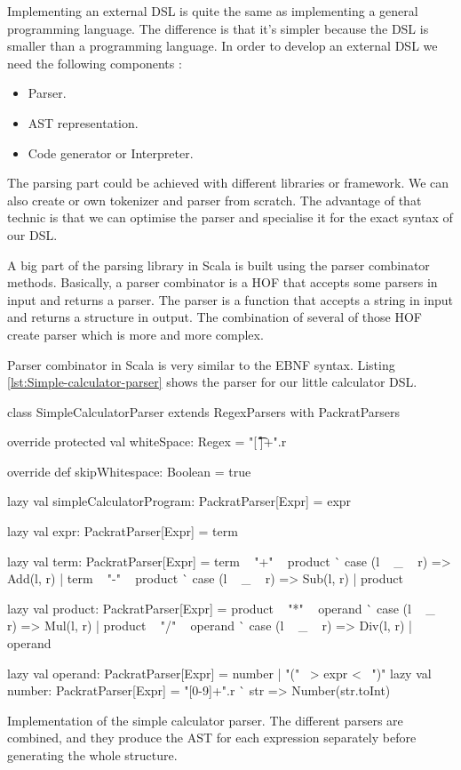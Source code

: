 Implementing an external \gls{DSL} is quite the same as implementing a general
programming language. The difference is that it's simpler because the \gls{DSL}
is smaller than a programming language. In order to develop an external
\gls{DSL} we need the following components :

\begin{itemize}
\item Parser.
\item \gls{AST} representation.
\item Code generator or Interpreter.
\end{itemize}


The parsing part could be achieved with different libraries or framework. We can
also create or own tokenizer and parser from scratch. The advantage of that
technic is that we can optimise the parser and specialise it for the exact
syntax of our \gls{DSL}.

A big part of the parsing library in Scala is built using the parser combinator
method\cite{Odersky:2016:PSU:2988396}s. Basically, a parser combinator is a
\gls{HOF} that accepts some parsers in input and returns a parser. The parser is
a function that accepts a string in input and returns a structure in output. The
combination of several of those \gls{HOF} create parser which is more and more
complex.

Parser combinator in Scala is very similar to the \gls{EBNF} syntax. Listing
\ref{lst:Simple-calculator-parser} shows the parser for our little calculator \gls{DSL}.

\begin{listing}[ht]
\centering
\begin{scalacode}
class SimpleCalculatorParser extends RegexParsers with PackratParsers {
  override protected val whiteSpace: Regex = "[ \t\r\f\n]+".r

  override def skipWhitespace: Boolean = true

  lazy val simpleCalculatorProgram: PackratParser[Expr] = expr

  lazy val expr: PackratParser[Expr] = term

  lazy val term: PackratParser[Expr] = {
    term ~ "+" ~ product ^^ { case (l ~ _ ~ r) => Add(l, r) } |
      term ~ "-" ~ product ^^ { case (l ~ _ ~ r) => Sub(l, r) } |
      product
  }

  lazy val product: PackratParser[Expr] = {
    product ~ "*" ~ operand ^^ { case (l ~ _ ~ r) => Mul(l, r) } |
      product ~ "/" ~ operand ^^ { case (l ~ _ ~ r) => Div(l, r) } |
      operand
  }

  lazy val operand: PackratParser[Expr] = number | "(" ~> expr <~ ")"
  lazy val number: PackratParser[Expr] = "[0-9]+".r ^^ { str => Number(str.toInt) }
}
\end{scalacode}
\caption[Implementation of the simple calculator parser]{Implementation of the
simple calculator parser. The different parsers are combined, and they produce
the \gls{AST} for each expression separately before generating the whole structure.}
\label{lst:Simple-calculator-parser}
\end{listing}

